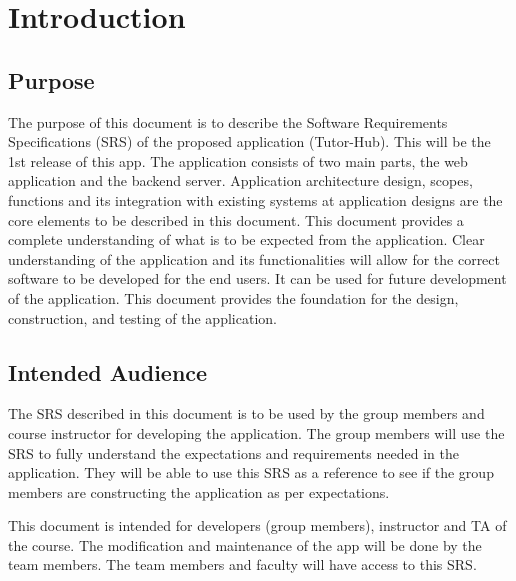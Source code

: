 \chapter{Introduction}
\label{ch:intro}

\section{Purpose }
The purpose of this document is to describe the Software Requirements Specifications (SRS) of the proposed application (Tutor-Hub). This will be the 1st release of this app. The application consists of two main parts, the web application and the backend server. Application architecture design, scopes, functions and its integration with existing systems at application designs are the core elements to be described in this document. This document provides a complete understanding of what is to be expected from the application. Clear understanding of the application and its functionalities will allow for the correct software to be developed for the end users. It can be used for future development of the application. This document provides the foundation for the design, construction, and testing of the application.

\section{Intended Audience}
The SRS described in this document is to be used by the group members and course instructor for developing the application. The group members will use the SRS to fully understand the expectations and requirements needed in the application. They will be able to use this SRS as a reference to see if the group members are constructing the application as per expectations.

This document is intended for developers (group members), instructor and TA of the course. The modification and maintenance of the app will be done by the team members. The team members and faculty will have access to this SRS.

